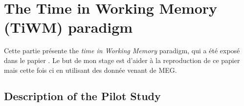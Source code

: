 





\section{The Time in Working Memory (TiWM) paradigm}

Cette partie présente the \textit{time in Working Memory} paradigm, qui a été exposé dans le papier \cite{herbst2021abstracting}. Le but de mon stage est d'aider à la reproduction de ce papier mais cette fois ci en utilisant des donnée venant de MEG.

\subsection{Description of the Pilot Study}

